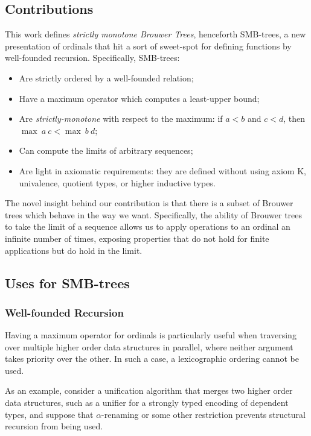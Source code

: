 \subsection{Contributions}

This work defines \textit{strictly monotone Brouwer Trees}, henceforth SMB-trees,
a new presentation of ordinals that hit a sort of sweet-spot for defining functions by
well-founded recursion. Specifically, SMB-trees:

\begin{itemize}
  \item Are strictly ordered by a well-founded relation;
  \item Have a maximum operator which computes a least-upper bound;
  \item Are \textit{strictly-monotone} with respect to the maximum: if $a < b$ and $c < d$, then $\max\ a\ c < \max\ b\ d$;
  \item Can compute the limits of arbitrary sequences;
  \item Are light in axiomatic requirements: they are defined without using axiom K,
        univalence, quotient types, or higher inductive types.
\end{itemize}

The novel insight behind our contribution is that there is a subset of
Brouwer trees which behave in the way we want. Specifically,
the ability of Brouwer trees to take the limit of a sequence allows
us to apply operations to an ordinal an infinite number of times,
exposing properties that do not hold for finite applications but do hold
in the limit.

\subsection{Uses for SMB-trees}

\subsubsection{Well-founded Recursion}

Having a maximum operator for ordinals is particularly useful when traversing over multiple higher order
data structures in parallel, where neither argument takes priority over the other.
In such a case, a lexicographic ordering cannot be used.

As an example, consider a unification algorithm that merges
two higher order data structures, such as a unifier for a strongly typed encoding of dependent types,
 and suppose that $\alpha$-renaming or some other restriction prevents
 structural recursion from being used.

